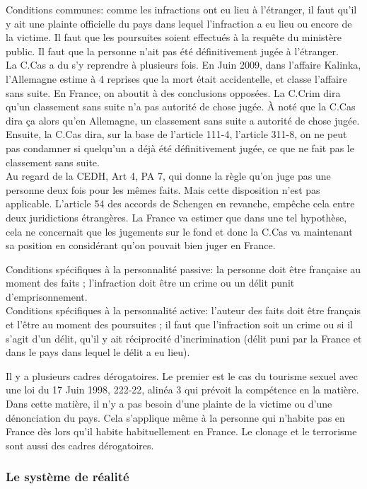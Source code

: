 \documentclass[10pt, a4paper, openany]{book}
\begin{document}
Conditions communes: comme les infractions ont eu lieu à l'étranger, il faut qu'il y ait une plainte officielle du pays dans lequel l'infraction a eu lieu ou encore de la victime. Il faut que les poursuites soient effectués à la requête du ministère public. Il faut que la personne n'ait pas été définitivement jugée à l'étranger. \\
La C.Cas a du s'y reprendre à plusieurs fois. En Juin 2009, dans l'affaire Kalinka, l'Allemagne estime à 4 reprises que la mort était accidentelle, et classe l'affaire sans suite. En France, on aboutit à des conclusions opposées. La C.Crim dira qu'un classement sans suite n'a pas autorité de chose jugée. À noté que la C.Cas dira ça alors qu'en Allemagne, un classement sans suite a autorité de chose jugée. Ensuite, la C.Cas dira, sur la base de l'article 111-4, l'article 311-8, on ne peut pas condamner si quelqu'un a déjà été définitivement jugée, ce que ne fait pas le classement sans suite. \\
Au regard de la CEDH, Art 4, PA 7, qui donne la règle qu'on juge pas une personne deux fois pour les mêmes faits. Mais cette disposition n'est pas applicable. L'article 54 des accords de Schengen en revanche, empêche cela entre deux juridictions étrangères. La France va estimer que dans une tel hypothèse, cela ne concernait que les jugements sur le fond et donc la C.Cas va maintenant sa position en considérant qu'on pouvait bien juger en France. 


Conditions spécifiques à la personnalité passive: la personne doit être française au moment des faits ; l'infraction doit être un crime ou un délit punit d'emprisonnement. \\
Conditions spécifiques à la personnalité active: l'auteur des faits doit être français et l'être au moment des poursuites ; il faut que l'infraction soit un crime ou si il s'agit d'un délit, qu'il y ait réciprocité d'incrimination (délit puni par la France et dans le pays dans lequel le délit a eu lieu). 


Il y a plusieurs cadres dérogatoires. Le premier est le cas du tourisme sexuel avec une loi du 17 Juin 1998, 222-22, alinéa 3 qui prévoit la compétence en la matière. Dans cette matière, il n'y a pas besoin d'une plainte de la victime ou d'une dénonciation du pays. Cela s'applique même à la personne qui n'habite pas en France dès lors qu'il habite habituellement en France. Le clonage et le terrorisme sont aussi des cadres dérogatoires. 

\subsubsection{Le système de réalité}
\end{document}
